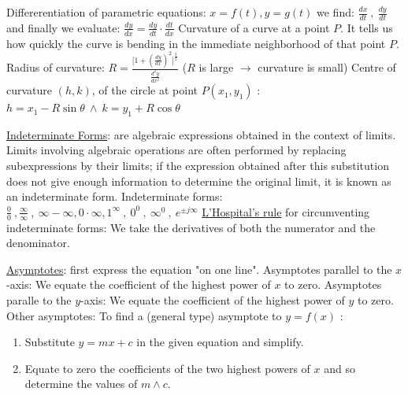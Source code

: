 \documentclass[12pt]{article}
\begin{document}
\begin{flushleft}
	\textbullet \quad Differerentiation of parametric equations: $x=f(t), y=g(t)$ we find: $\displaystyle \frac{dx}{dt}\ , \ \frac{dy}{dt}$ and finally we evaluate: $\displaystyle \frac{dy}{dx} = \frac{dy}{dt} \cdot \frac{dt}{dx} $ \linebreak 
	\textbullet \quad Curvature of a curve at a point $P$. It tells us how quickly the curve is bending in the immediate neighborhood of that point $P$. \linebreak 
	\textbullet \quad Radius of curvature: $\displaystyle R=\frac{\big[ 1 + \left( \frac{dy}{dx} \right)^2 \big]^{\frac{3}{2}}}{\frac{d^2y}{dx^2}} $ ($R$ is large $\rightarrow$ curvature is small) \linebreak 
	\textbullet \quad Centre of curvature $(h,k)$, of the circle at point $\displaystyle P(x_1, y_1)$  :  $h = x_1 - R\sin \theta \ \land \ k = y_1 + R \cos \theta $ \linebreak 
	
	\textbullet \quad \uline{Indeterminate Forms}: are algebraic expressions obtained in the context of limits. Limits involving algebraic operations are often performed by replacing subexpressions by their limits; if the expression obtained after this substitution does not give enough information to determine the original limit, it is known as an indeterminate form. Indeterminate forms: \linebreak 
	 $\displaystyle \frac{0}{0}\ , \frac{\infty}{\infty}\ , \ \infty - \infty , 0 \cdot \infty , 1^{\infty} \ , \ 0^0\ , \ \infty^0 \ , \ e^{\pm j \infty} $ \linebreak 
	\textbullet \quad \uline{L'Hospital's rule} for circumventing indeterminate forms: We take the derivatives of both the numerator and the denominator. \linebreak 
	
	\textbullet \quad \uline{Asymptotes}: first express the equation "on one line". \linebreak 
	\textbullet \quad Asymptotes parallel to the $x$-axis: We equate the coefficient of the highest power of $x$ to zero. \linebreak 
	\textbullet \quad Asymptotes paralle to the $y$-axis: We equate the coefficient of the highest power of $y$ to zero. \linebreak 
	\textbullet \quad Other asymptotes: To find a (general type) asymptote to $y=f(x)$  :   
	\begin{enumerate}
	\item Substitute $y=mx + c$ in the given equation and simplify. 
	\item Equate to zero the coefficients of the two highest powers of $x$ and so determine the values of $m \land c$. \linebreak 
	\end{enumerate}


\end{flushleft}
\end{document}
